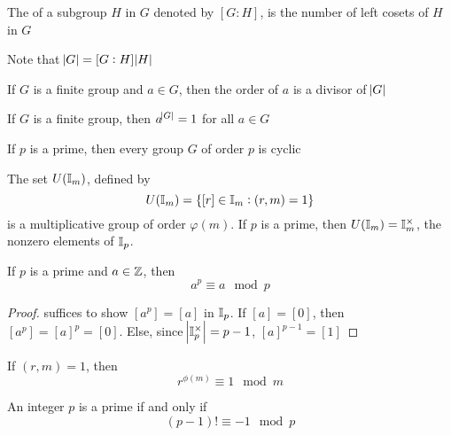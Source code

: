\documentclass[11pt]{article}
\begin{document}
\begin{definition}[]
The  of a subgroup \(H\) in \(G\) denoted by \([G:H]\), is the number of
left cosets of \(H\) in \(G\)
\end{definition}

Note that \(\abs{G}=[G:H]\abs{H}\)

\begin{corollary}[]
If \(G\) is a finite group and \(a\in G\), then the order of \(a\) is a divisor of
\(\abs{G}\) 
\end{corollary}

\begin{corollary}[]
If \(G\) is a finite group, then \(a^{\abs{G}}=1\) for all \(a\in G\)
\end{corollary}

\begin{corollary}[]
If \(p\) is a prime, then every group \(G\) of order \(p\) is cyclic
\end{corollary}

\begin{proposition}[]
The set \(U(\mathbb{I}_m)\), defined by
\begin{equation*}
 U(\mathbb{I}_m)=\{[r]\in\mathbb{I}_m:(r,m)=1\}
\end{equation*}
is a multiplicative group of order \(\varphi(m)\). If \(p\) is a prime, then
\(U(\mathbb{I}_m)=\mathbb{I}_m^{\times}\), the nonzero elements of \(\mathbb{I}_p\).
\end{proposition}

\begin{corollary}[Fermat]
If \(p\) is a prime and \(a\in\mathbb{Z}\), then
\begin{equation*}
a^p\equiv a\mod p
\end{equation*}
\end{corollary}

\begin{proof}
suffices to show \([a^p]=[a]\) in \(\mathbb{I}_p\). If \([a]=[0]\), then \([a^p]=[a]^p=[0]\).
Else, since \(\abs{\mathbb{I}_p^\times}=p-1\), \([a]^{p-1}=[1]\)
\end{proof}


\begin{theorem}[Euler]
If \((r,m)=1\), then
\begin{equation*}
r^{\phi(m)}\equiv 1\mod m
\end{equation*}
\end{theorem}

\begin{theorem}
An integer \(p\) is a prime if and only if
\begin{equation*}
(p-1)!\equiv -1\mod p
\end{equation*}
\end{theorem}
\end{document}
